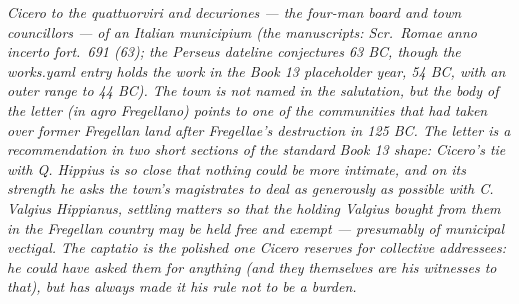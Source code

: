 
\textit{Cicero to the \textit{quattuorviri} and
\textit{decuriones} --- the four-man board and town
councillors --- of an Italian municipium (the
manuscripts: \textit{Scr.\ Romae anno incerto fort.\
691 (63)}; the Perseus dateline conjectures 63 BC,
though the works.yaml entry holds the work in the
Book 13 placeholder year, 54 BC, with an outer range
to 44 BC). The town is not named in the salutation, but
the body of the letter (\textit{in agro Fregellano})
points to one of the communities that had taken over
former Fregellan land after Fregellae's destruction in
125 BC. The letter is a recommendation in two short
sections of the standard Book 13 shape: Cicero's tie
with Q. Hippius is so close that nothing could be more
intimate, and on its strength he asks the town's
magistrates to deal as generously as possible with C.
Valgius Hippianus, settling matters so that the holding
Valgius bought from them in the Fregellan country may
be held free and exempt --- presumably of municipal
\textit{vectigal}. The captatio is the polished one
Cicero reserves for collective addressees: he could
have asked them for anything (and they themselves
are his witnesses to that), but has always made it
his rule not to be a burden.}
